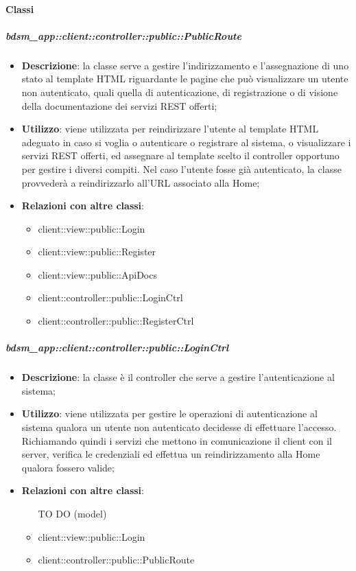 	\paragraph{Classi} %
		\subparagraph{bdsm\_app::client::controller::public::PublicRoute} %
		\label{subp:bdsm_app_client_controller_public_publicrouteconfig}
		\begin{itemize}
			\item \textbf{Descrizione}: la classe serve a gestire l'indirizzamento e l'assegnazione di uno stato al template HTML riguardante le pagine che può visualizzare un utente non autenticato, quali quella di autenticazione, di registrazione o di visione della documentazione dei servizi REST offerti;
			\item \textbf{Utilizzo}: viene utilizzata per reindirizzare l'utente al template HTML adeguato in caso si voglia o autenticare o registrare al sistema, o visualizzare i servizi REST offerti, ed assegnare al template scelto il controller opportuno per gestire i diversi compiti. Nel caso l'utente fosse già autenticato, la classe provvederà a reindirizzarlo all'URL associato alla Home;
			\item \textbf{Relazioni con altre classi}:
				\begin{itemize}
					\item client::view::public::Login
					\item client::view::public::Register
					\item client::view::public::ApiDocs
					\item client::controller::public::LoginCtrl
					\item client::controller::public::RegisterCtrl
				\end{itemize}
		\end{itemize}

		\subparagraph{bdsm\_app::client::controller::public::LoginCtrl} %
		\label{subp:bdsm_app_client_controller_public_loginctrl}
			\begin{itemize}
				\item \textbf{Descrizione}: la classe è il controller che serve a gestire l'autenticazione al sistema;
				\item \textbf{Utilizzo}: viene utilizzata per gestire le operazioni di autenticazione al sistema qualora un utente non autenticato decidesse di effettuare l'accesso. Richiamando quindi i servizi che mettono in comunicazione il client con il server, verifica le credenziali ed effettua un reindirizzamento alla Home qualora fossero valide;
				\item \textbf{Relazioni con altre classi}:
					\begin{itemize}
						\item [TO DO] (model)
						\item client::view::public::Login
						\item client::controller::public::PublicRoute
					\end{itemize}
			\end{itemize}

